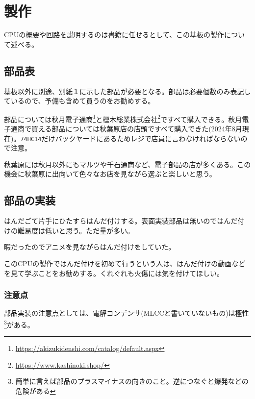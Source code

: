 \documentclass[xelatex,a5paper,ja=standard, openany]{bxjsbook}
\begin{document}
\chapter{製作}
CPUの概要や回路を説明するのは書籍に任せるとして、この基板の製作について述べる。

\section{部品表}
基板以外に別途、別紙１に示した部品が必要となる。部品は必要個数のみ表記しているので、予備も含めて買うのをお勧めする。\par

部品については秋月電子通商\footnote{\url{https://akizukidenshi.com/catalog/default.aspx}}と樫木総業株式会社\footnote{\url{https://www.kashinoki.shop/}}ですべて購入できる。秋月電子通商で買える部品については秋葉原店の店頭ですべて購入できた(2024年8月現在)。\texttt{74HC14}だけバックヤードにあるためレジで店員に言わなければならないので注意。\par

秋葉原には秋月以外にもマルツや千石通商など、電子部品の店が多くある。この機会に秋葉原に出向いて色々なお店を見ながら選ぶと楽しいと思う。

\section{部品の実装}
はんだごて片手にひたすらはんだ付けする。表面実装部品は無いのではんだ付けの難易度は低いと思う。ただ量が多い。\par
暇だったのでアニメを見ながらはんだ付けをしていた。\par
このCPUの製作ではんだ付けを初めて行うという人は、はんだ付けの動画などを見て学ぶことをお勧めする。くれぐれも火傷には気を付けてほしい。


\subsection{注意点}
部品実装の注意点としては、電解コンデンサ(MLCCと書いていないもの)は極性\footnote{簡単に言えば部品のプラスマイナスの向きのこと。逆につなぐと爆発などの危険がある}がある。
\end{document}
